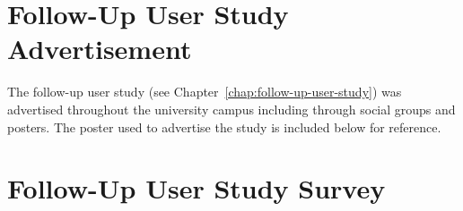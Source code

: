 \chapter{Follow-Up User Study Advertisement}
\label{appendix:follow-up-user-study-advertisement}

The follow-up user study (see Chapter~\ref{chap:follow-up-user-study}) was advertised throughout the university campus including through social groups and posters. The poster used to advertise the study is included below for reference.

\begin{center}
\end{center}

\chapter{Follow-Up User Study Survey}
\label{appendix:follow-up-user-study-survey}

